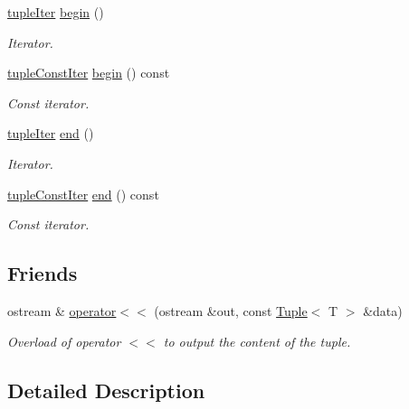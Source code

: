 \begin{DoxyCompactItemize}
\mbox{\hyperlink{maths_8hh_ad22dcdeefda7d41523cc1604953eb6cc}{tuple\+Iter}} \mbox{\hyperlink{class_tuple_a205dfb3c3dcad03ced830b5c9687d225}{begin}} ()
\begin{DoxyCompactList}\small\item\em Iterator. \end{DoxyCompactList}\item 
\mbox{\hyperlink{maths_8hh_a2eba794860251c1b30e532df32ee4d1b}{tuple\+Const\+Iter}} \mbox{\hyperlink{class_tuple_ab5d618dac69995db6adb0e657cd73bb3}{begin}} () const
\begin{DoxyCompactList}\small\item\em Const iterator. \end{DoxyCompactList}\item 
\mbox{\hyperlink{maths_8hh_ad22dcdeefda7d41523cc1604953eb6cc}{tuple\+Iter}} \mbox{\hyperlink{class_tuple_a345d8a3efbf58fe4cc7295c3cf66e8ab}{end}} ()
\begin{DoxyCompactList}\small\item\em Iterator. \end{DoxyCompactList}\item 
\mbox{\hyperlink{maths_8hh_a2eba794860251c1b30e532df32ee4d1b}{tuple\+Const\+Iter}} \mbox{\hyperlink{class_tuple_ac55a72437773f17dd8fbccf866d7e7eb}{end}} () const
\begin{DoxyCompactList}\small\item\em Const iterator. \end{DoxyCompactList}\end{DoxyCompactItemize}
\subsection*{Friends}
\begin{DoxyCompactItemize}
\item 
ostream \& \mbox{\hyperlink{class_tuple_a2e6e2a2521038ab827ff2aa73023a53d}{operator$<$$<$}} (ostream \&out, const \mbox{\hyperlink{class_tuple}{Tuple}}$<$ T $>$ \&data)
\begin{DoxyCompactList}\small\item\em Overload of operator $<$$<$ to output the content of the tuple. \end{DoxyCompactList}\end{DoxyCompactItemize}


\subsection{Detailed Description}
